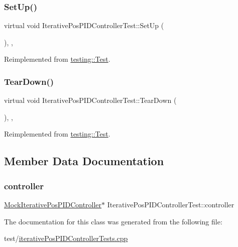 \subsubsection{\texorpdfstring{SetUp()}{SetUp()}}
{\footnotesize\ttfamily virtual void Iterative\+Pos\+P\+I\+D\+Controller\+Test\+::\+Set\+Up (\begin{DoxyParamCaption}{ }\end{DoxyParamCaption})\hspace{0.3cm}{\ttfamily [inline]}, {\ttfamily [protected]}, {\ttfamily [virtual]}}



Reimplemented from \mbox{\hyperlink{classtesting_1_1Test_a190315150c303ddf801313fd1a777733}{testing\+::\+Test}}.

\mbox{\label{classIterativePosPIDControllerTest_aaf5bef722d91ba9f7af5744f2eb3b67e}} 
\subsubsection{\texorpdfstring{TearDown()}{TearDown()}}
{\footnotesize\ttfamily virtual void Iterative\+Pos\+P\+I\+D\+Controller\+Test\+::\+Tear\+Down (\begin{DoxyParamCaption}{ }\end{DoxyParamCaption})\hspace{0.3cm}{\ttfamily [inline]}, {\ttfamily [protected]}, {\ttfamily [virtual]}}



Reimplemented from \mbox{\hyperlink{classtesting_1_1Test_a5f0ab439802cbe0ef7552f1a9f791923}{testing\+::\+Test}}.



\subsection{Member Data Documentation}
\mbox{\label{classIterativePosPIDControllerTest_ae8293d36aa235bdc4b8e10eee8fad86d}} 
\subsubsection{\texorpdfstring{controller}{controller}}
{\footnotesize\ttfamily \mbox{\hyperlink{classMockIterativePosPIDController}{Mock\+Iterative\+Pos\+P\+I\+D\+Controller}}$\ast$ Iterative\+Pos\+P\+I\+D\+Controller\+Test\+::controller\hspace{0.3cm}{\ttfamily [protected]}}



The documentation for this class was generated from the following file\+:\begin{DoxyCompactItemize}
\item 
test/\mbox{\hyperlink{iterativePosPIDControllerTests_8cpp}{iterative\+Pos\+P\+I\+D\+Controller\+Tests.\+cpp}}\end{DoxyCompactItemize}
